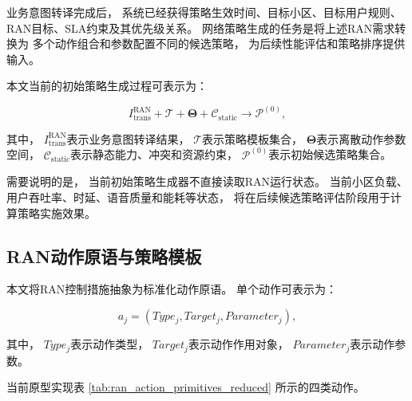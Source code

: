 \documentclass[lang=cn,12pt]{elegantbook}
\begin{document}
业务意图转译完成后，
系统已经获得策略生效时间、目标小区、目标用户规则、
RAN目标、SLA约束及其优先级关系。
网络策略生成的任务是将上述RAN需求转换为
多个动作组合和参数配置不同的候选策略，
为后续性能评估和策略排序提供输入。

本文当前的初始策略生成过程可表示为：

\begin{equation}
I_{\mathrm{trans}}^{\mathrm{RAN}}
+
\mathcal{T}
+
\boldsymbol{\Theta}
+
\mathcal{C}_{\mathrm{static}}
\longrightarrow
\mathcal{P}^{(0)},
\label{eq:initial_policy_generation_reduced}
\end{equation}

其中，
$I_{\mathrm{trans}}^{\mathrm{RAN}}$表示业务意图转译结果，
$\mathcal{T}$表示策略模板集合，
$\boldsymbol{\Theta}$表示离散动作参数空间，
$\mathcal{C}_{\mathrm{static}}$表示静态能力、冲突和资源约束，
$\mathcal{P}^{(0)}$表示初始候选策略集合。

需要说明的是，
当前初始策略生成器不直接读取RAN运行状态。
当前小区负载、用户吞吐率、时延、语音质量和能耗等状态，
将在后续候选策略评估阶段用于计算策略实施效果。


\subsection*{RAN动作原语与策略模板}

本文将RAN控制措施抽象为标准化动作原语。
单个动作可表示为：

\begin{equation}
a_j
=
\left(
Type_j,
Target_j,
Parameter_j
\right),
\label{eq:ran_action_primitive_reduced}
\end{equation}

其中，
$Type_j$表示动作类型，
$Target_j$表示动作作用对象，
$Parameter_j$表示动作参数。

当前原型实现表
\ref{tab:ran_action_primitives_reduced}
所示的四类动作。
\end{document}
